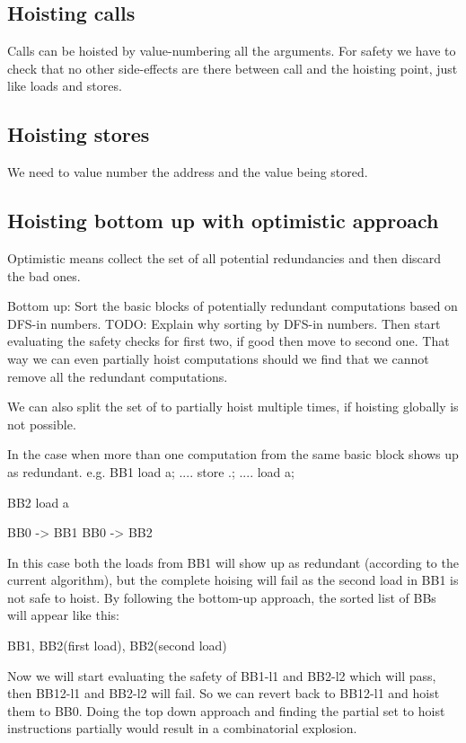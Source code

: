 \begin{section}
\section{Hoisting calls}
Calls can be hoisted by value-numbering all the arguments. For safety we have to check that no other side-effects are there
between call and the hoisting point, just like loads and stores.

\section{Hoisting stores}
We need to value number the address and the value being stored.

\section{Hoisting bottom up with optimistic approach}
Optimistic means collect the set of all potential redundancies and then discard the bad ones.

Bottom up:
Sort the basic blocks of potentially redundant computations based on DFS-in numbers.
TODO: Explain why sorting by DFS-in numbers.
Then start evaluating the safety checks for first two, if good then move to second one. That way we can even
partially hoist computations should we find that we cannot remove all the redundant computations.

We can also split the set of to partially hoist multiple times, if hoisting globally is not possible.

In the case when more than one computation from the same basic block shows up as redundant.
e.g.
BB1
load a;
....
store .;
....
load a;


BB2
load a

BB0 -> BB1
BB0 -> BB2

In this case both the loads from BB1 will show up as redundant (according to the current algorithm), but the complete
hoising will fail as the second load in BB1 is not safe to hoist. By following the bottom-up approach, the sorted list
of BBs will appear like this:

{ BB1, BB2(first load), BB2(second load) }

Now we will start evaluating the safety of BB1-l1 and BB2-l2 which will pass, then BB12-l1 and BB2-l2 will fail.
So we can revert back to BB12-l1 and hoist them to BB0. Doing the top down approach and finding the partial set
to hoist instructions partially would result in a combinatorial explosion.


\end{section}
